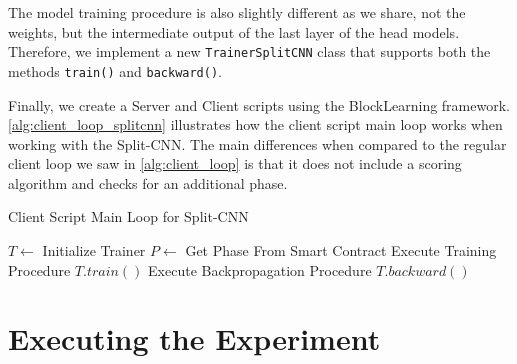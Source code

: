 The model training procedure is also slightly different as we share, not the weights, but the intermediate output of the last layer of the head models. Therefore, we implement a new \texttt{TrainerSplitCNN} class that supports both the methods \texttt{train()} and \texttt{backward()}.

Finally, we create a Server and Client scripts using the BlockLearning framework. \autoref{alg:client_loop_splitcnn} illustrates how the client script main loop works when working with the Split-CNN. The main differences when compared to the regular client loop we saw in \autoref{alg:client_loop} is that it does not include a scoring algorithm and checks for an additional phase.

\begin{algorithm}
\caption{Client Script Main Loop for Split-CNN}\label{alg:client_loop_splitcnn}
\begin{algorithmic}
\State $T \gets $ Initialize Trainer
    \State $P \gets$ Get Phase From Smart Contract
        \State Execute Training Procedure $T.train()$
        \State Execute Backpropagation Procedure $T.backward()$
    \EndIf
\EndWhile
\end{algorithmic}
\end{algorithm}



\section{Executing the Experiment}


